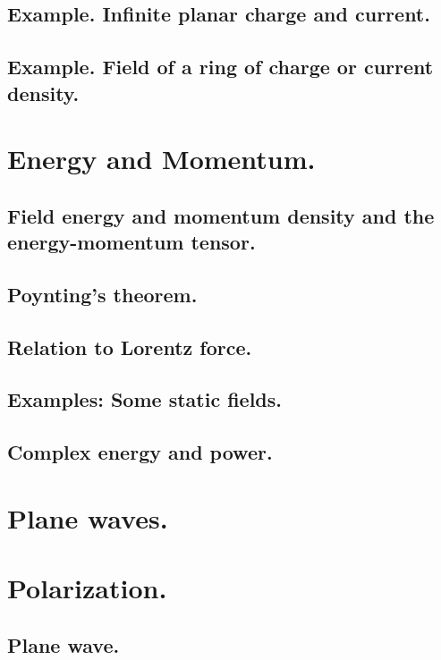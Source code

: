          \subsection{Example.  Infinite planar charge and current.}
            
         \subsection{Example.  Field of a ring of charge or current density.}
            
      \section{Energy and Momentum.}
         \subsection{Field energy and momentum density and the energy-momentum tensor.}
            
         \subsection{Poynting's theorem.}
            
         \subsection{Relation to Lorentz force.}
            
         \subsection{Examples: Some static fields.}
            
         \subsection{Complex energy and power.}
            
      \section{Plane waves.}
         
      \section{Polarization.}
         \subsection{Plane wave.}
            
